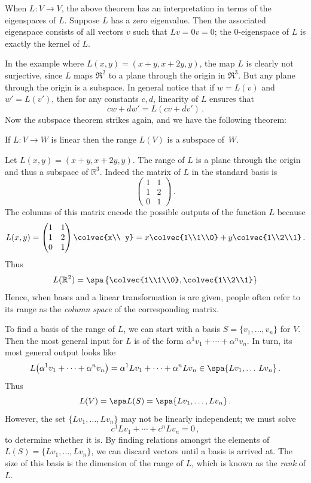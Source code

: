 When $L:V\to V$, the above theorem has an interpretation in terms of the eigenspaces of $L$. Suppose $L$ has a zero eigenvalue.  Then the associated eigenspace consists of all vectors $v$ such that $Lv=0v=0$; the $0$-eigenspace of $L$ is exactly the kernel of $L$.  



In the example where $L(x,y)=(x+y,x+2y,y)$, the map $L$ is clearly not surjective, since $L$ maps $\Re^2$ to a plane through the origin in $\Re^3$. But any plane through the origin is a subspace. In general notice 
that if $w=L(v)$ and $w'=L(v')$, then for any constants $c,d$, linearity of $L$ ensures that \[cw+dw' = L(cv+dv')\, .\]  Now the subspace theorem strikes again, and we have the following theorem:

\begin{theorem}
If $L \colon V\rightarrow W$ is linear then the range $L(V)$ is a subspace of~$W$.
\end{theorem}

\begin{example}
Let $L(x,y)=(x+y,x+2y,y)$. The range of $L$ is a plane through the origin and thus a subspace of ${\mathbb R}^3$.
Indeed the matrix of $L$ in the standard basis is 
\[
\begin{pmatrix}1&1\\1&2\\0&1\end{pmatrix}\, .
\]
The columns of this matrix encode the possible outputs of the function $L$ because
\[
L(x,y)=\begin{pmatrix}1&1\\1&2\\0&1\end{pmatrix}\colvec{x\\ y}=x \colvec{1\\1\\0}+y\colvec{1\\2\\1}\, . 
\]
Thus 
\[
L({\mathbb R}^2)=\spa \left\{\colvec{1\\1\\0},\colvec{1\\2\\1}\right\}
\]
Hence, when  bases and a linear transformation is are given, people often refer to its range as the {\itshape column space}
of the corresponding matrix.
\end{example}

To find a basis of the range of $L$, we can start with a basis $S=\{v_1, \ldots, v_n\} $ for $V$. Then
the most general input for $L$ is of the form  $\alpha^1 v_1 + \cdots + \alpha^n v_n$. In turn, its most general output looks like
\[
L\big(\alpha^1 v_1 + \cdots + \alpha^n v_n\big)=\alpha^1 Lv_1 + \cdots + \alpha^n Lv_n\in \spa\{Lv_1,\ldots\,Lv_n\}\, .
\]
Thus
\[
L(V)=\spa L(S) = \spa \{Lv_1, \ldots, Lv_n\}\, .
\]
However, the set $\{Lv_1, \ldots, Lv_n\}$ may not be linearly independent; we must solve 
\[
c^1Lv_1+ \cdots + c^nLv_n=0\, ,
\]
to determine whether it is.
By finding relations amongst the elements of $L(S)=\{Lv_1,\ldots ,L v_n\}$, we can discard vectors until a basis is arrived at.  The size of this basis is the dimension of the range of $L$, which is known as the \emph{rank} of $L$.


